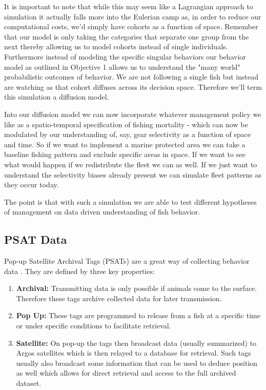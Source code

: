 \documentclass[11pt]{article}
\begin{document}
It is important to note that while this may seem like a Lagrangian approach to simulation it actually falls more into the Eulerian camp as, in order to reduce our computational costs, we'd simply have cohorts as a function of space. Remember that our model is only taking the categories that separate one group from the next thereby allowing us to model cohorts instead of single individuals. Furthermore instead of modeling the specific singular behaviors our behavior model as outlined in Objective 1 allows us to understand the "many world" probabilistic outcomes of behavior. We are not following a single fish but instead are watching as that cohort diffuses across its decision space. Therefore we'll term this simulation a diffusion model.

Into our diffusion model we can now incorporate whatever management policy we like as a spatio-temporal specification of fishing mortality - which can now be modulated by our understanding of, say, gear selectivity as a function of space and time. So if we want to implement a marine protected area we can take a baseline fishing pattern and exclude specific areas in space. If we want to see what would happen if we redistribute the fleet we can as well. If we just want to understand the selectivity biases already present we can simulate fleet patterns as they occur today. 

The point is that with such a simulation we are able to test different hypotheses of management on data driven understanding of fish behavior. 


\subsection{PSAT Data}

Pop-up Satellite Archival Tags (PSATs) are a great way of collecting behavior data \cite{PSAT}. They are defined by three key properties:

\begin{enumerate}
\item \textbf{Archival:} Transmitting data is only possible if animals come to the surface. Therefore these tags archive collected data for later transmission. 
\item \textbf{Pop Up:} These tags are programmed to release from a fish at a specific time or under specific conditions to facilitate retrieval. 
\item \textbf{Satellite:} On pop-up the tags then broadcast data (usually summarized) to Argos satellites which is then relayed to a database for retrieval. Such tags usually also broadcast some information that can be used to deduce position as well which allows for direct retrieval and access to the full archived dataset.
\end{enumerate}
\end{document}
